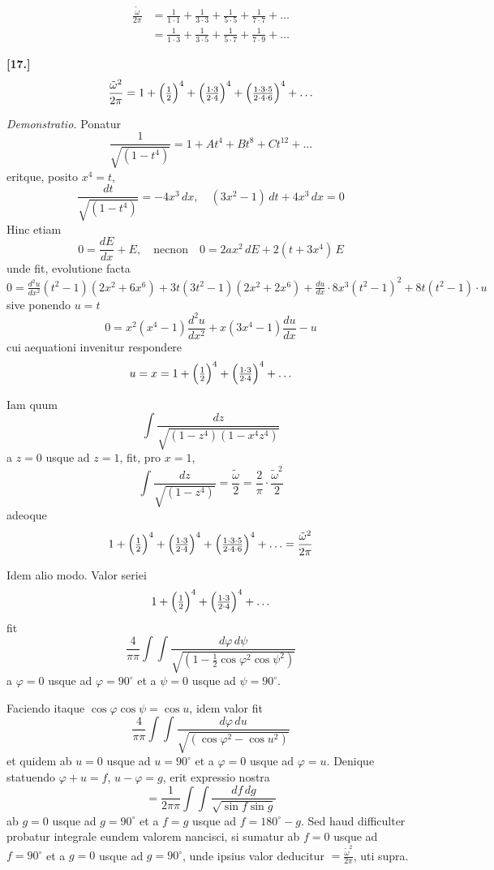 \documentclass[10pt,a4paper]{article}
\begin{document}
\begin{align*}
\frac{\tilde{\omega}}{2\pi} &= \frac{1}{1\cdot1} + \frac{1}{3\cdot3} + \frac{1}{5\cdot5} + \frac{1}{7\cdot7} + \ldots\\
&= \frac{1}{1\cdot3} + \frac{1}{3\cdot5} + \frac{1}{5\cdot7} + \frac{1}{7\cdot9} + \ldots
\end{align*}

\medskip
\noindent\textbf{[17.]}
\[
\frac{\tilde{\omega}^2}{2\pi} = 1 + \Bigl(\tfrac{1}{2}\Bigr)^4 + \Bigl(\tfrac{1\cdot3}{2\cdot4}\Bigr)^4 + \Bigl(\tfrac{1\cdot3\cdot5}{2\cdot4\cdot6}\Bigr)^4 + \ldots
\]

\textit{Demonstratio.} Ponatur
\[
\frac{1}{\sqrt{(1-t^4)}} = 1 + At^4 + Bt^8 + Ct^{12} + \ldots
\]
eritque, posito $x^4 = t$,
\[
\frac{dt}{\sqrt{(1-t^4)}} = -4x^3\,dx, \quad (3x^2-1)\,dt + 4x^3\,dx = 0
\]
Hinc etiam
\[
0 = \frac{dE}{dx} + E, \quad \text{necnon} \quad 0 = 2ax^2\,dE + 2(t+3x^4)\,E
\]
unde fit, evolutione facta
\[
0 = \tfrac{d^2u}{dx^2}(t^2-1)(2x^2+6x^6) + 3t(3t^2-1)(2x^2+2x^6) + \tfrac{du}{dx}\cdot 8x^3(t^2-1)^2 + 8t(t^2-1)\cdot u
\]
sive ponendo $u=t$
\[
0 = x^2(x^4-1)\frac{d^2u}{dx^2} + x(3x^4-1)\frac{du}{dx} - u
\]
cui aequationi invenitur respondere
\[
u = x = 1 + \Bigl(\tfrac{1}{2}\Bigr)^4 + \Bigl(\tfrac{1\cdot3}{2\cdot4}\Bigr)^4 + \ldots
\]

Iam quum
\[
\int\!\frac{dz}{\sqrt{(1-z^4)(1-x^4z^4)}}
\]
a $z=0$ usque ad $z=1$, fit, pro $x=1$,
\[
\int\!\frac{dz}{\sqrt{(1-z^4)}} = \frac{\tilde{\omega}}{2} = \frac{2}{\pi}\cdot\frac{\tilde{\omega}^2}{2}
\]
adeoque
\[
1 + \Bigl(\tfrac{1}{2}\Bigr)^4 + \Bigl(\tfrac{1\cdot3}{2\cdot4}\Bigr)^4 + \Bigl(\tfrac{1\cdot3\cdot5}{2\cdot4\cdot6}\Bigr)^4 + \ldots = \frac{\tilde{\omega}^2}{2\pi}
\]

Idem alio modo. Valor seriei
\[
1 + \Bigl(\tfrac{1}{2}\Bigr)^4 + \Bigl(\tfrac{1\cdot3}{2\cdot4}\Bigr)^4 + \ldots
\]
fit
\[
\frac{4}{\pi\pi}\int\!\int\!\frac{d\varphi\,d\psi}{\sqrt{(1-\tfrac12\cos\varphi^2\cos\psi^2)}}
\]
a $\varphi=0$ usque ad $\varphi=90^\circ$ et a $\psi=0$ usque ad $\psi=90^\circ$.

Faciendo itaque $\cos\varphi\cos\psi=\cos u$, idem valor fit
\[
\frac{4}{\pi\pi}\int\!\int\!\frac{d\varphi\,du}{\sqrt{(\cos\varphi^2-\cos u^2)}}
\]
et quidem ab $u=0$ usque ad $u=90^\circ$ et a $\varphi=0$ usque ad $\varphi=u$. Denique statuendo $\varphi+u=f$, $u-\varphi=g$, erit expressio nostra
\[
= \frac{1}{2\pi\pi}\int\!\int\!\frac{df\,dg}{\sqrt{\sin f \sin g}}
\]
ab $g=0$ usque ad $g=90^\circ$ et a $f=g$ usque ad $f=180^\circ-g$. Sed haud difficulter probatur integrale eundem valorem nancisci, si sumatur ab $f=0$
usque ad $f=90^\circ$ et a $g=0$ usque ad $g=90^\circ$, unde ipsius valor deducitur $= \frac{\tilde{\omega}^2}{2\pi}$, uti supra.
\end{document}
